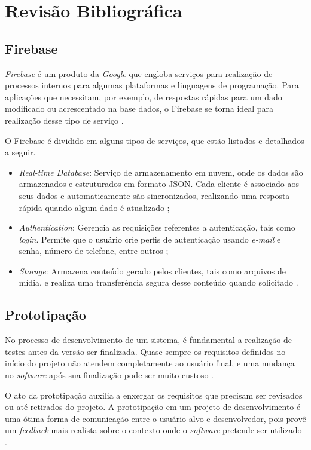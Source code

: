 \chapter{Revisão Bibliográfica}

\section{Firebase}

\textit{Firebase} é um produto da \textit{Google} que engloba serviços para realização de  processos internos para algumas plataformas e linguagens de programação. Para aplicações que necessitam, por exemplo, de respostas rápidas para um dado modificado ou acrescentado na base dados, o Firebase se torna ideal para realização desse tipo de serviço \cite{firebase}.

O Firebase é dividido em alguns tipos de serviços, que estão listados e detalhados a seguir.

\begin{itemize}
    \item \textit{Real-time Database}: Serviço de armazenamento em nuvem, onde os dados são armazenados e estruturados em formato JSON. Cada cliente é associado aos seus dados e automaticamente são sincronizados, realizando uma resposta rápida quando algum dado é atualizado \cite{firebase};
    \item \textit{Authentication}: Gerencia as requisições referentes a autenticação, tais como \textit{login}. Permite que o usuário crie perfis de autenticação usando \textit{e-mail} e senha, número de telefone, entre outros \cite{firebase};
    \item \textit{Storage}: Armazena conteúdo gerado pelos clientes, tais como arquivos de mídia, e realiza uma transferência segura desse conteúdo quando solicitado \cite{firebase}. 
\end{itemize}

\section{Prototipação}

No processo de desenvolvimento de um sistema, é fundamental a realização de testes antes da versão ser finalizada. Quase sempre os requisitos definidos no início do projeto não atendem completamente ao usuário final, e uma mudança no \textit{software} após sua finalização pode ser muito custoso \cite{prototipacao}.

O ato da prototipação auxilia a enxergar os requisitos que precisam ser revisados ou até retirados do projeto. A prototipação em um projeto de desenvolvimento é uma ótima forma de comunicação entre o usuário alvo e desenvolvedor, pois provê um \textit{feedback} mais realista sobre o contexto onde o \textit{software} pretende ser utilizado \cite{prototipacao}.

